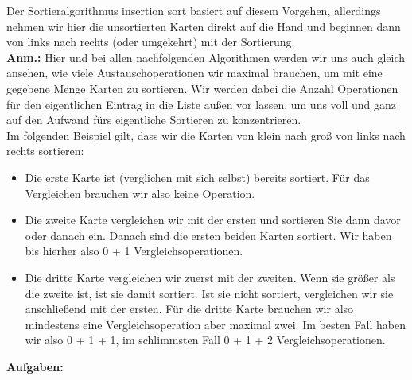 Der Sortieralgorithmus insertion sort basiert auf diesem Vorgehen, allerdings nehmen wir hier die unsortierten Karten direkt auf die Hand und beginnen dann von links nach rechts (oder umgekehrt) mit der Sortierung.\\

\textbf{Anm.:} Hier und bei allen nachfolgenden Algorithmen werden wir uns auch gleich ansehen, wie viele Austauschoperationen wir maximal brauchen, um mit eine gegebene Menge Karten zu sortieren. Wir werden dabei die Anzahl Operationen für den eigentlichen Eintrag in die Liste außen vor lassen, um uns voll und ganz auf den Aufwand fürs eigentliche Sortieren zu konzentrieren.\\

Im folgenden Beispiel gilt, dass wir die Karten von klein nach groß von links nach rechts sortieren:

\begin{itemize}
	\item Die erste Karte ist (verglichen mit sich selbst) bereits sortiert. Für das Vergleichen brauchen wir also keine Operation.
	\item Die zweite Karte vergleichen wir mit der ersten und sortieren Sie dann davor oder danach ein. Danach sind die ersten beiden Karten sortiert. Wir haben bis hierher also 0 + 1 Vergleichsoperationen.
	\item Die dritte Karte vergleichen wir zuerst mit der zweiten. Wenn sie größer als die zweite ist, ist sie damit sortiert. Ist sie nicht sortiert, vergleichen wir sie anschließend mit der ersten. Für die dritte Karte brauchen wir also mindestens eine Vergleichsoperation aber maximal zwei. Im besten Fall haben wir also 0 + 1 + 1, im schlimmsten Fall 0 + 1 + 2 Vergleichsoperationen.
\end{itemize}

\textbf{Aufgaben:}


